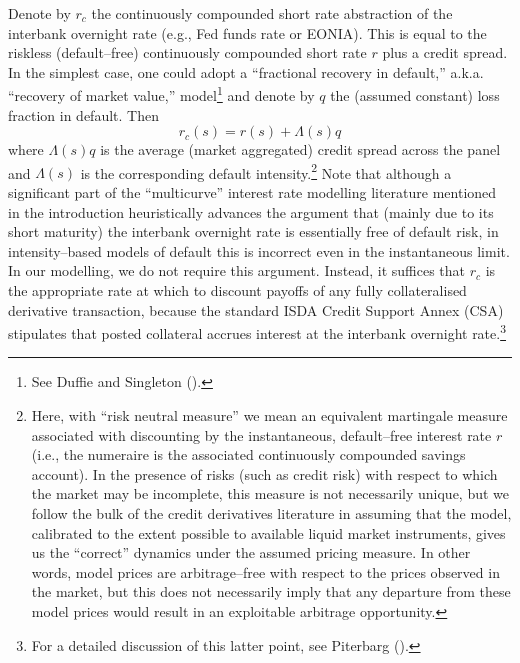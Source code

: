 \documentclass[12pt,a4paper]{article}
\theoremstyle{plain}
\numberwithin{equation}{section}
\begin{document}
Denote by $r_c$ the continuously compounded short rate abstraction of the interbank overnight rate (e.g., Fed funds rate or EONIA). This is equal to the riskless (default--free) continuously compounded short rate $r$ plus a credit spread. In the simplest case, one could adopt a ``fractional recovery in default,'' a.k.a. ``recovery of market value,'' model\footnote{See Duffie and Singleton (\citeyear*{OZ:Duf&Sin:99}).} and denote by $q$ the (assumed constant) loss fraction in default. Then
\begin{equation}
r_c(s)=r(s)+\Lambda(s)q
\label{collateral}\end{equation}
where $\Lambda(s)q$ is the average (market aggregated) credit spread across the panel and $\Lambda(s)$ is the corresponding default intensity.\footnote{Here, with ``risk neutral measure'' we mean an equivalent martingale measure associated with discounting by the instantaneous, default--free interest rate $r$ (i.e., the numeraire is the associated continuously compounded savings account). In the presence of risks (such as credit risk) with respect to which the market may be incomplete, this measure is not necessarily unique, but we follow the bulk of the credit derivatives literature in assuming that the model, calibrated to the extent possible to available liquid market instruments, gives us the ``correct'' dynamics under the assumed pricing measure. In other words, model prices are arbitrage--free with respect to the prices observed in the market, but this does not necessarily imply that any departure from these model prices would result in an exploitable arbitrage opportunity.} Note that although a significant part of the ``multicurve'' interest rate modelling literature mentioned in the introduction heuristically advances the argument that (mainly due to its short maturity) the interbank overnight rate is essentially free of default risk, in intensity--based models of default this is incorrect even in the instantaneous limit. In our modelling, we do not require this argument. Instead, it suffices that $r_c$ is the appropriate rate at which to discount payoffs of any fully collateralised derivative transaction, because the standard ISDA Credit Support Annex (CSA) stipulates that posted collateral accrues interest at the interbank overnight rate.\footnote{For a detailed discussion of this latter point, see Piterbarg (\citeyear*{Piterbarg2010}).}
\end{document}

